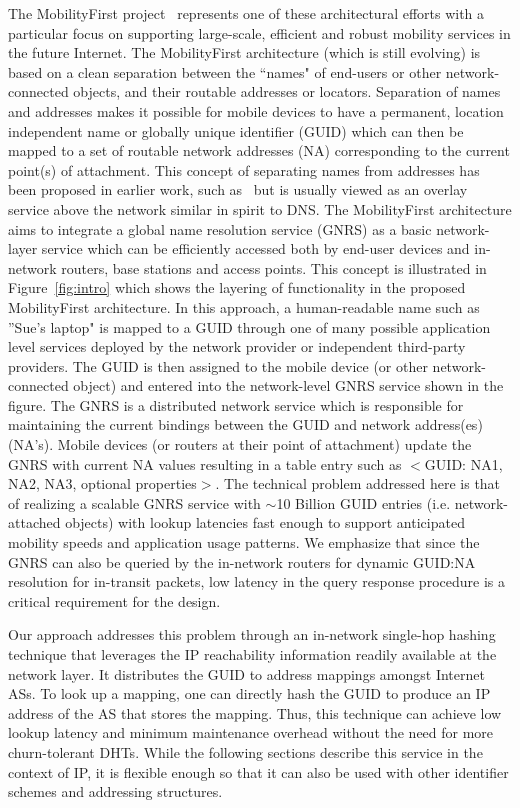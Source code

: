 The MobilityFirst project~\cite{mobilityFirst} represents one of these architectural efforts with a particular focus on supporting large-scale, efficient and robust mobility services in the future Internet. The MobilityFirst architecture (which is still evolving) is based on a clean separation between the ``names" of end-users or other network-connected objects, and their routable addresses or locators. Separation of names and addresses makes it possible for mobile devices to have a permanent, location independent name or globally unique identifier (GUID) which can then be mapped to a set of routable network addresses (NA) corresponding to the current point(s) of attachment. This concept of separating names from addresses has been proposed in earlier work, such as~\cite{farinacci,andersen} but is usually viewed as an overlay service above the network similar in spirit to DNS. The MobilityFirst architecture aims to integrate a global name resolution service (GNRS) as a basic network-layer service which can be efficiently accessed both by end-user devices and in-network routers, base stations and access points. This concept is illustrated in Figure~\ref{fig:intro} which shows the layering of functionality in the proposed MobilityFirst architecture. In this approach, a human-readable name such as ''Sue's laptop" is mapped to a GUID through one of many possible application level services deployed by the network provider or independent third-party providers. The GUID is then assigned to the mobile device (or other network-connected object) and entered into the network-level GNRS service shown in the figure. The GNRS is a distributed network service which is responsible for maintaining the current bindings between the GUID and network address(es) (NA's). Mobile devices (or routers at their point of attachment) update the GNRS with current NA values resulting in a table entry such as $<$GUID: NA1, NA2, NA3, optional properties$>$. The technical problem addressed here is that of realizing a scalable GNRS service with $\sim$10 Billion GUID entries (i.e. network-attached objects) with lookup latencies fast enough to support anticipated mobility speeds and application usage patterns. We emphasize that since the GNRS can also be queried by the in-network routers for dynamic GUID:NA resolution for in-transit packets, low latency in the query response procedure is a critical requirement for the design.

Our approach addresses this problem through an in-network single-hop hashing technique that leverages the IP reachability information readily available at the network layer. It distributes the GUID to address mappings amongst Internet ASs. To look up a mapping, one can directly hash the GUID to produce an IP address of the AS that stores the mapping. Thus, this technique can achieve low lookup latency and minimum maintenance overhead without the need for more churn-tolerant DHTs. While the following sections describe this service in the context of IP, it is flexible enough so that it can also be used with other identifier schemes and addressing structures.
